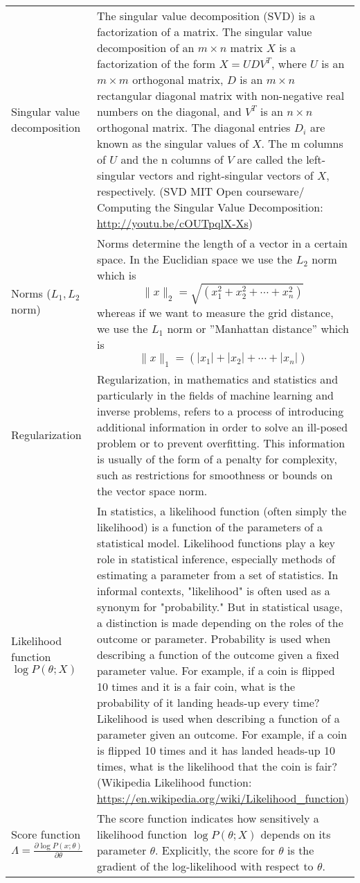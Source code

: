 \documentclass[main]{subfiles}
\begin{document}
\begin{longtable}{p{0.3\linewidth} p{0.7\linewidth}}
Singular value decomposition \label{SVD@Glossary} &  The singular value decomposition (SVD) is a factorization of a matrix. The singular value decomposition of an \(m \times n\) matrix \(X\) is a factorization of the form \(X = UDV^T\), where \(U\) is an \(m \times m\) orthogonal matrix, \(D\) is an \(m \times n\) rectangular diagonal matrix with non-negative real numbers on the diagonal, and \(V^T\) is an \(n \times n\) orthogonal matrix. The diagonal entries \(D_i\) are known as the singular values of \(X\). The m columns of \(U\) and the n columns of \(V\) are called the left-singular vectors and right-singular vectors of \(X\), respectively. (SVD MIT Open courseware/ Computing the Singular Value Decomposition: \url{http://youtu.be/cOUTpqlX-Xs})\\
Norms (\(L_1,L_2\) norm) \label{Norms@Glossary}& Norms determine the length of a vector in a certain space. In the Euclidian space we use the \(L_2\) norm which is \[\|x\|_2=\sqrt{\left(x_1^2+x_2^2+\dotsb+x_n^2\right)}\] whereas if we want to measure the grid distance, we use the \(L_1\) norm or ''Manhattan distance'' which is \[ \|x\|_1=\left(|x_1|+|x_2|+\dotsb+|x_n|\right)\]\\
Regularization & Regularization, in mathematics and statistics and particularly in the fields of machine learning and inverse problems, refers to a process of introducing additional information in order to solve an ill-posed problem or to prevent overfitting. This information is usually of the form of a penalty for complexity, such as restrictions for smoothness or bounds on the vector space norm.\\
Likelihood function \(\log P(\theta; X)\) & In statistics, a likelihood function (often simply the likelihood) is a function of the parameters of a statistical model. Likelihood functions play a key role in statistical inference, especially methods of estimating a parameter from a set of statistics. In informal contexts, "likelihood" is often used as a synonym for "probability." But in statistical usage, a distinction is made depending on the roles of the outcome or parameter. Probability is used when describing a function of the outcome given a fixed parameter value. For example, if a coin is flipped 10 times and it is a fair coin, what is the probability of it landing heads-up every time? Likelihood is used when describing a function of a parameter given an outcome. For example, if a coin is flipped 10 times and it has landed heads-up 10 times, what is the likelihood that the coin is fair? (Wikipedia Likelihood function: \url{https://en.wikipedia.org/wiki/Likelihood_function})\\
Score function \(\Lambda = \frac{\partial \log P(x;\theta)}{\partial\theta}\) &  The score function indicates how sensitively a likelihood function \(\log P(\theta; X)\) depends on its parameter \(\theta\). Explicitly, the score for \(\theta\) is the gradient of the log-likelihood with respect to \(\theta\).
\end{longtable}
\end{document}

